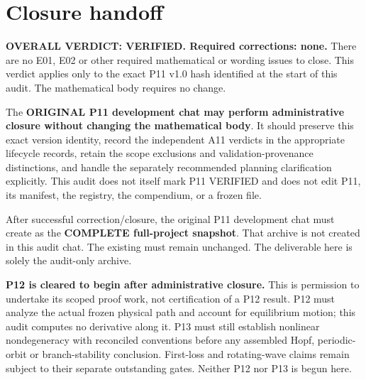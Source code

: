 \documentclass[11pt]{article}
\begin{document}
\par\medskip\noindent\begin{minipage}{\linewidth}
\noindent{}\par
{}\par
\end{minipage}\par

\section{Closure handoff}
\textbf{OVERALL VERDICT: VERIFIED. Required corrections: none.}
There are no E01, E02 or other required mathematical or wording issues to
close. This verdict applies only to the exact P11 v1.0 hash identified at
the start of this audit. The mathematical body requires no change.

The \textbf{ORIGINAL P11 development chat may perform administrative closure
without changing the mathematical body}. It should preserve this exact
version identity, record the independent A11 verdicts in the appropriate
lifecycle records, retain the scope exclusions and validation-provenance
distinctions, and handle the separately recommended planning clarification
explicitly. This audit does not itself mark P11 VERIFIED and does not edit
P11, its manifest, the registry, the compendium, or a frozen file.

After successful correction/closure, the original P11 development chat
must create  as the
\textbf{COMPLETE full-project snapshot}. That archive is not created in
this audit chat. The existing 
must remain unchanged. The deliverable here is solely the audit-only archive.

\textbf{P12 is cleared to begin after administrative closure.} This is
permission to undertake its scoped proof work, not certification of a P12
result. P12 must analyze the actual frozen physical path and account for
equilibrium motion; this audit computes no derivative along it. P13 must
still establish nonlinear nondegeneracy with reconciled conventions before
any assembled Hopf, periodic-orbit or branch-stability conclusion. First-loss
and rotating-wave claims remain subject to their separate outstanding gates.
Neither P12 nor P13 is begun here.
\end{document}
